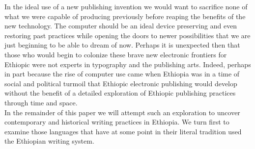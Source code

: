 In the ideal use of a new publishing invention we would want to sacrifice none of what we were capable of producing previously before reaping the benefits of the new technology.  The computer should be an ideal device preserving and even restoring past practices while opening the doors to newer possibilities that we are just beginning to be able to dream of now.  Perhaps it is unexpected then that those who would begin to colonize these brave new electronic frontiers for Ethiopic were not experts in typography and the publishing arts.  Indeed, perhaps in part because the rise of computer use came when Ethiopia was in a time of social and political turmoil that Ethiopic electronic publishing would develop without the benefit of a detailed exploration of Ethiopic publishing practices through time and space.\\

In the remainder of this paper we will attempt such an exploration to uncover contemporary and historical writing practices in Ethiopia.  We turn first to examine those languages that have at some point in their literal tradition used the Ethiopian writing system.\\

